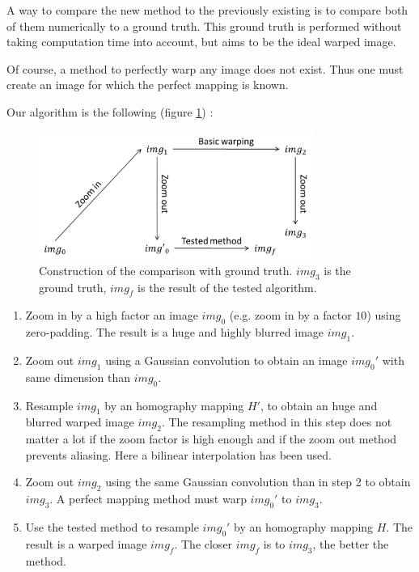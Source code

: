 
A way to compare the new method to the previously existing is to compare both of them numerically to a ground truth. This ground truth is performed without taking computation time into account, but aims to be the ideal warped image.

Of course, a method to perfectly warp any image does not exist. Thus one must create an image for which the perfect mapping is known.

Our algorithm is the following (figure \ref{SchemaGroundTruth}) :
\begin{figure}
\centering
\includegraphics[width=0.8\textwidth]{SchemaGroundTruth.png}
\caption{Construction of the comparison with ground truth. $img_3$ is the ground truth, $img_f$ is the result of the tested algorithm.}
\label{SchemaGroundTruth}
\end{figure}
\begin{enumerate}
	\item Zoom in by a high factor an image $img_0$ (e.g. zoom in by a factor $10$) using zero-padding. The result is a huge and highly blurred image $img_1$.
	\item Zoom out $img_1$ using a Gaussian convolution to obtain an image $img_0'$ with same dimension than $img_0$.
	\item Resample $img_1$ by an homography mapping $H'$, to obtain an huge and blurred warped image $img_2$. The resampling method in this step does not matter a lot if the zoom factor is high enough and if the zoom out method prevents aliasing. Here a bilinear interpolation has been used.
	\item Zoom out $img_2$ using the same Gaussian convolution than in step 2 to obtain $img_3$. A perfect mapping method must warp $img_0'$ to $img_3$.
	\item Use the tested method to resample $img_0'$ by an homography mapping $H$. The result is a warped image $img_f$. The closer $img_f$ is to $img_3$, the better the method.
\end{enumerate}

